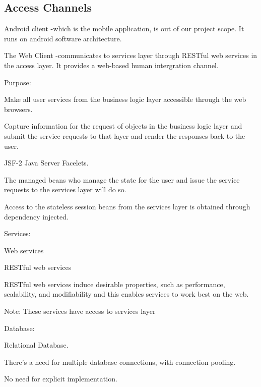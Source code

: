\documentclass[a4paper,12pt]{report}
\begin{document}
\subsection{Access Channels}
	\begin{description}
\item Android client -which is the mobile application, is out of our project scope. It runs on android software architecture.
\item The Web Client -communicates to services layer through RESTful web services in the access layer. It provides a web-based human intergration channel.
\item Purpose:
\item[$\bullet$] Make all user services from the business logic layer accessible through the web browsers.
\item[$\bullet$] Capture information for the request of objects in the business logic layer and submit the service requests to that layer and render the responses back to the user.
\item[$\bullet$] JSF-2  Java Server Facelets.
\item[$\bullet$]The managed beans who manage the state for the user and issue the service requests to the services layer will do so.
\item[$\bullet$] Access to the stateless session beans from the services layer is obtained through dependency injected.

\item Services:
\item[$\bullet$] Web services
\item[$\bullet$] RESTful web services
\item[$\bullet$] RESTful web services induce desirable properties, such as performance, scalability, and modifiability and this enables services to work best on the web.
\item[$\bullet$] Note: These services have access to services layer

\item Database: 
\item[$\bullet$] Relational Database.
\item[$\bullet$] There’s a need for multiple database connections, with connection pooling.
\item[$\bullet$] No need for explicit implementation.

\end{description}
\end{document}
